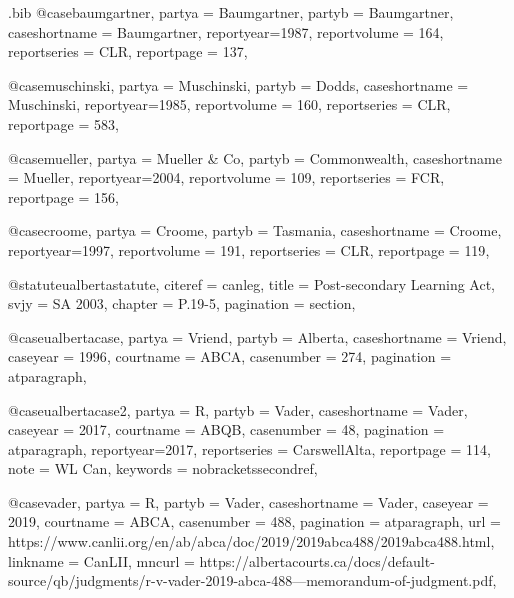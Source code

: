 \begin{filecontents*}[overwrite]{\jobname.bib}
@case{baumgartner,
  partya = {Baumgartner}, 
  partyb = {Baumgartner},
  caseshortname = {Baumgartner},
  reportyear={1987},
  reportvolume = {164},
  reportseries = {CLR},
  reportpage = {137},
	}




@case{muschinski,
  partya = {Muschinski}, 
  partyb = {Dodds},
  caseshortname = {Muschinski},
  reportyear={1985},
  reportvolume = {160},
  reportseries = {CLR},
  reportpage = {583},
	}


@case{mueller,
  partya = {Mueller \& Co}, 
  partyb = {Commonwealth},
  caseshortname = {Mueller},
  reportyear={2004},
  reportvolume = {109},
  reportseries = {FCR},
  reportpage = {156},
	}


@case{croome,
  partya = {Croome}, 
  partyb = {Tasmania},
  caseshortname = {Croome},
  reportyear={1997},
  reportvolume = {191},
  reportseries = {CLR},
  reportpage = {119},
	}



@statute{ualbertastatute,
citeref = {canleg},
title = {Post-secondary Learning Act},
svjy = {SA 2003},
chapter = {P.19-5},
pagination = {section},
}

@case{ualbertacase,
  partya = {Vriend}, 
  partyb = {Alberta},
  caseshortname = {Vriend},
  caseyear = {1996},
  courtname = {ABCA},
  casenumber = {274},
  pagination = {atparagraph},
	}


@case{ualbertacase2,
  partya = {R}, 
  partyb = {Vader},
  caseshortname = {Vader},
  caseyear = {2017},
  courtname = {ABQB},
  casenumber = {48},
  pagination = {atparagraph},
  reportyear={2017},
  reportseries = {CarswellAlta},
  reportpage = {114},
  note = {WL Can},
  keywords = {nobracketssecondref},
}


@case{vader,	partya =  {R},	partyb =  {Vader},	caseshortname =  {Vader},	caseyear =  {2019},	courtname =  {ABCA},	casenumber =  {488},	pagination =  {atparagraph}, url =  {https://www.canlii.org/en/ab/abca/doc/2019/2019abca488/2019abca488.html},	linkname =  {CanLII},	mncurl =  {https://albertacourts.ca/docs/default-source/qb/judgments/r-v-vader-2019-abca-488---memorandum-of-judgment.pdf},	}



\end{filecontents*}
